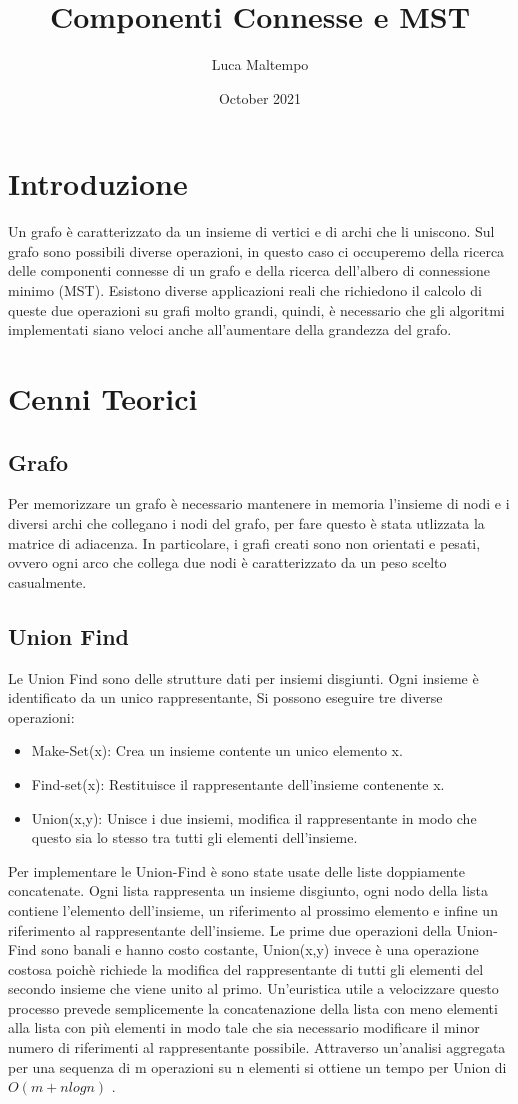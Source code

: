 \documentclass{article}
\title{Componenti Connesse e MST}
\author{Luca Maltempo}
\date{October 2021}
\begin{document}
\maketitle

\section{Introduzione}
Un grafo è caratterizzato da un insieme di vertici e di archi che li uniscono. Sul grafo sono possibili diverse operazioni, in questo caso ci occuperemo della ricerca delle componenti connesse di un grafo e della ricerca dell'albero di connessione minimo (MST). Esistono diverse applicazioni reali che richiedono il calcolo di queste due operazioni su grafi molto grandi, quindi, è necessario che gli algoritmi implementati siano veloci anche all'aumentare della grandezza del grafo.
\section{Cenni Teorici}
\subsection{Grafo}
Per memorizzare un grafo è necessario mantenere in memoria l'insieme di nodi e i diversi archi che collegano i nodi del grafo, per fare questo è stata utlizzata la matrice di adiacenza. In particolare, i grafi creati sono non orientati e pesati, ovvero ogni arco che collega due nodi è caratterizzato da un peso scelto casualmente.
\subsection{Union Find}
Le Union Find sono delle strutture dati per insiemi disgiunti. Ogni insieme è identificato da un unico rappresentante, Si possono eseguire tre diverse operazioni:
\begin{itemize}
    \item Make-Set(x): Crea un insieme contente un unico elemento x.
    \item Find-set(x): Restituisce il rappresentante dell'insieme contenente x.
    \item Union(x,y):  Unisce i due insiemi, modifica il rappresentante in modo che questo sia lo stesso tra tutti gli elementi dell'insieme.
\end{itemize}
Per implementare le Union-Find è sono state usate delle liste doppiamente concatenate. Ogni lista rappresenta un insieme disgiunto, ogni nodo della lista contiene l'elemento dell'insieme, un riferimento al prossimo elemento e infine un riferimento al rappresentante dell'insieme. Le prime due operazioni della Union-Find sono banali e hanno costo costante, Union(x,y) invece è una operazione costosa poichè richiede la modifica del rappresentante di tutti gli elementi del secondo insieme che viene unito al primo. Un'euristica utile a velocizzare questo processo prevede semplicemente la concatenazione della lista con meno elementi alla lista con più elementi in modo tale che sia necessario modificare il minor numero di riferimenti al rappresentante possibile.  Attraverso un'analisi aggregata per una sequenza di m operazioni su n elementi si ottiene un tempo per Union di $O(m+n log{} n)$ .
\end{document}
